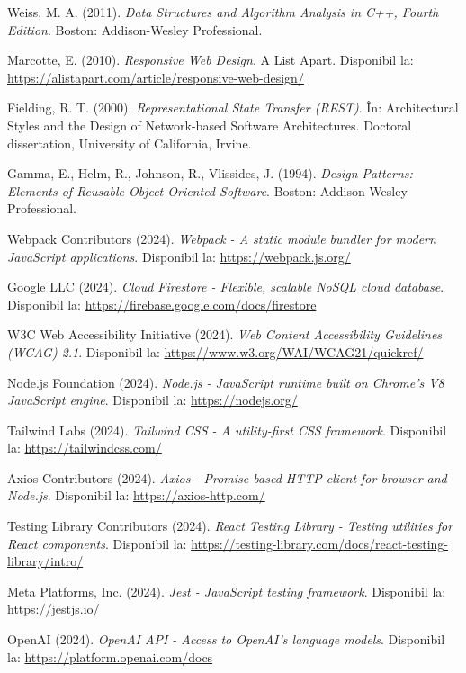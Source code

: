 \documentclass[12pt,a4paper]{report}
\begin{document}
\begin{thebibliography}{20}
Weiss, M. A. (2011). \textit{Data Structures and Algorithm Analysis in C++, Fourth Edition}. Boston: Addison-Wesley Professional.

Marcotte, E. (2010). \textit{Responsive Web Design}. A List Apart. Disponibil la: \url{https://alistapart.com/article/responsive-web-design/}

Fielding, R. T. (2000). \textit{Representational State Transfer (REST)}. În: Architectural Styles and the Design of Network-based Software Architectures. Doctoral dissertation, University of California, Irvine.

Gamma, E., Helm, R., Johnson, R., Vlissides, J. (1994). \textit{Design Patterns: Elements of Reusable Object-Oriented Software}. Boston: Addison-Wesley Professional.

Webpack Contributors (2024). \textit{Webpack - A static module bundler for modern JavaScript applications}. Disponibil la: \url{https://webpack.js.org/}

Google LLC (2024). \textit{Cloud Firestore - Flexible, scalable NoSQL cloud database}. Disponibil la: \url{https://firebase.google.com/docs/firestore}

W3C Web Accessibility Initiative (2024). \textit{Web Content Accessibility Guidelines (WCAG) 2.1}. Disponibil la: \url{https://www.w3.org/WAI/WCAG21/quickref/}

Node.js Foundation (2024). \textit{Node.js - JavaScript runtime built on Chrome's V8 JavaScript engine}. Disponibil la: \url{https://nodejs.org/}

Tailwind Labs (2024). \textit{Tailwind CSS - A utility-first CSS framework}. Disponibil la: \url{https://tailwindcss.com/}

Axios Contributors (2024). \textit{Axios - Promise based HTTP client for browser and Node.js}. Disponibil la: \url{https://axios-http.com/}

Testing Library Contributors (2024). \textit{React Testing Library - Testing utilities for React components}. Disponibil la: \url{https://testing-library.com/docs/react-testing-library/intro/}

Meta Platforms, Inc. (2024). \textit{Jest - JavaScript testing framework}. Disponibil la: \url{https://jestjs.io/}

OpenAI (2024). \textit{OpenAI API - Access to OpenAI's language models}. Disponibil la: \url{https://platform.openai.com/docs}


\end{thebibliography}
\end{document}
